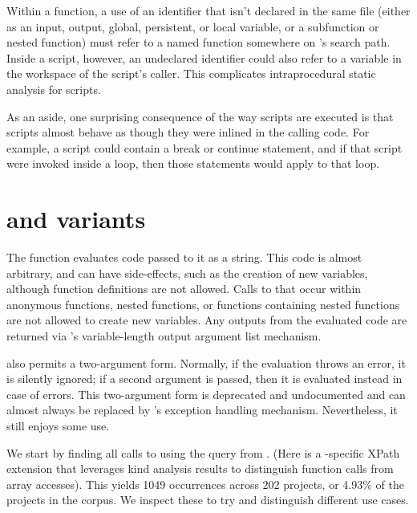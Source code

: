 Within a function, a use of an identifier that isn't declared in the same file
(either as an input, output, global, persistent, or local variable, or a
subfunction or nested function) must refer to a named function somewhere on
\matlab's search path. Inside a script, however, an undeclared identifier could
also refer to a variable in the workspace of the script's caller. This
complicates intraprocedural static analysis for scripts.

As an aside, one surprising consequence of the way scripts are executed is that
scripts almost behave as though they were inlined in the calling code. For
example, a script could contain a break or continue statement, and if that
script were invoked inside a loop, then those statements would apply to that
loop.


\section{ and variants} \label{sec:Eval}

The  function evaluates \matlab code passed to it as a string. This
code is almost arbitrary, and can have side-effects, such as the creation of
new variables, although function definitions are not allowed. Calls to
 that occur within anonymous functions, nested functions, or
functions containing nested functions are not allowed to create new variables.
Any outputs from the evaluated code are returned via \matlab's variable-length
output argument list mechanism.

 also permits a two-argument form. Normally, if the evaluation
throws an error, it is silently ignored; if a second argument is passed, then
it is evaluated instead in case of errors. This two-argument form is deprecated
and undocumented and can almost always be replaced by \matlab's  exception handling mechanism. Nevertheless, it still enjoys some use.

We start by finding all calls to  using the query from
. (Here  is a \mcbench-specific XPath
extension that leverages kind analysis results to distinguish function calls
from array accesses). This yields 1049 occurrences across 202 projects, or
4.93\% of the projects in the corpus. We inspect these to try and distinguish
different use cases.

